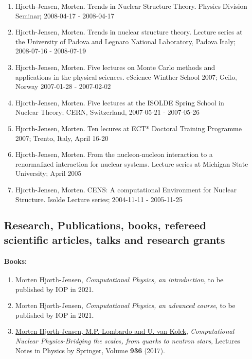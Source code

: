 \documentclass[%
oneside,                 %
final,                   %
10pt]{article}
\begin{document}
\begin{enumerate}
\item Hjorth-Jensen, Morten.  Trends in Nuclear Structure Theory. Physics Division Seminar; 2008-04-17 - 2008-04-17

\item Hjorth-Jensen, Morten.  Trends in nuclear structure theory. Lecture series at the University of Padova and Legnaro National Laboratory, Padova Italy; 2008-07-16 - 2008-07-19

\item Hjorth-Jensen, Morten.  Five lectures on  Monte Carlo methods and applications in the physical sciences. eScience Winther School 2007; Geilo, Norway 2007-01-28 - 2007-02-02

\item Hjorth-Jensen, Morten.  Five lectures at the ISOLDE Spring School in Nuclear Theory; CERN, Switzerland, 2007-05-21 - 2007-05-26

\item Hjorth-Jensen, Morten.  Ten lecures at  ECT* Doctoral Training Programme 2007; Trento, Italy, April 16-20

\item Hjorth-Jensen, Morten.  From the nucleon-nucleon interaction to a renormalized interaction for nuclear systems. Lecture series at Michigan State University; April 2005

\item Hjorth-Jensen, Morten. CENS: A computational Environment for Nuclear Structure. Isolde Lecture series; 2004-11-11 - 2005-11-25
\end{enumerate}

\noindent
\subsection*{Research, Publications, books, refereed scientific articles, talks and research grants}

\paragraph{Books:}
\begin{enumerate}
\item Morten Hjorth-Jensen, \emph{Computational Physics, an introduction}, to be published by IOP in 2021.

\item Morten Hjorth-Jensen, \emph{Computational Physics, an advanced course}, to be published by IOP in 2021.

\item \href{{http://www.springer.com/us/book/9783319533353}}{Morten Hjorth-Jensen, M.P. Lombardo and U. van Kolck}, \emph{Computational Nuclear Physics-Bridging the scales, from quarks to neutron stars}, Lectures Notes in Physics by Springer, Volume \textbf{936} (2017).
\end{enumerate}
\end{document}
